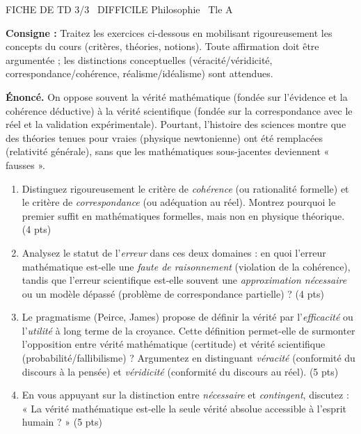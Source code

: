 \documentclass[11pt]{article}
\begin{document}
\begin{tcolorbox}[enhanced,colback=popink,colframe=popink,arc=10pt,boxrule=0pt,left=12pt,right=12pt,top=9pt,bottom=9pt]
{\color{white}\popxbold\small FICHE DE TD 3/3 \textbullet\ DIFFICILE \hfill Philosophie \textbullet\ Tle A\par}
\end{tcolorbox}
\vspace{4pt}
\noindent\textbf{Consigne :} Traitez les exercices ci-dessous en mobilisant rigoureusement les concepts du cours (critères, théories, notions). Toute affirmation doit être argumentée ; les distinctions conceptuelles (véracité/véridicité, correspondance/cohérence, réalisme/idéalisme) sont attendues.

\begin{exercice}
\textbf{Énoncé.} On oppose souvent la vérité mathématique (fondée sur l'évidence et la cohérence déductive) à la vérité scientifique (fondée sur la correspondance avec le réel et la validation expérimentale). Pourtant, l'histoire des sciences montre que des théories tenues pour vraies (physique newtonienne) ont été remplacées (relativité générale), sans que les mathématiques sous-jacentes deviennent « fausses ».

\begin{enumerate}
    \item Distinguez rigoureusement le critère de \textit{cohérence} (ou rationalité formelle) et le critère de \textit{correspondance} (ou adéquation au réel). Montrez pourquoi le premier suffit en mathématiques formelles, mais non en physique théorique. (4 pts)
    \item Analysez le statut de l'\textit{erreur} dans ces deux domaines : en quoi l'erreur mathématique est-elle une \textit{faute de raisonnement} (violation de la cohérence), tandis que l'erreur scientifique est-elle souvent une \textit{approximation nécessaire} ou un modèle dépassé (problème de correspondance partielle) ? (4 pts)
    \item Le pragmatisme (Peirce, James) propose de définir la vérité par l'\textit{efficacité} ou l'\textit{utilité} à long terme de la croyance. Cette définition permet-elle de surmonter l'opposition entre vérité mathématique (certitude) et vérité scientifique (probabilité/fallibilisme) ? Argumentez en distinguant \textit{véracité} (conformité du discours à la pensée) et \textit{véridicité} (conformité du discours au réel). (5 pts)
    \item En vous appuyant sur la distinction entre \textit{nécessaire} et \textit{contingent}, discutez : « La vérité mathématique est-elle la seule vérité absolue accessible à l'esprit humain ? » (5 pts)
\end{enumerate}
\end{exercice}
\end{document}

